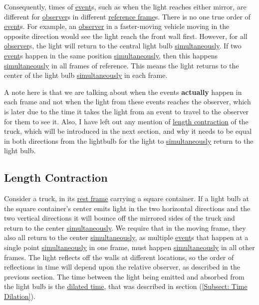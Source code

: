 Consequently, times of \hyperlink{def-event}{event}s, such as when the light reaches either mirror, are different for \hyperlink{def-observer}{observer}s in different \hyperlink{def-Reference-frame}{reference frame}s.
There is no one true order of \hyperlink{def-event}{event}s.
For example, an \hyperlink{def-observer}{observer} in a faster-moving vehicle moving in the opposite direction would see the light reach the front wall first.
However, for all \hyperlink{def-observer}{observer}s, the light will return to the central light bulb \hyperlink{def-simultaneity}{simultaneously}.
If two \hyperlink{def-event}{event}s happen in the same position \hyperlink{def-simultaneity}{simultaneously}, then this happens \hyperlink{def-simultaneity}{simultaneously} in all frames of reference.
This means the light returns to the center of the light bulb \hyperlink{def-simultaneity}{simultaneously} in each frame.

A note here is that we are talking about when the events \textbf{actually} happen in each frame and not when the light from these events reaches the observer, which is later due to the time it takes the light from an event to travel to the observer for them to see it.
Also, I have left out any mention of \hyperlink{def-length-contraction}{length contraction} of the truck, which will be introduced in the next section, and why it needs to be equal in both directions from the lightbulb for the light to \hyperlink{def-simultaneity}{simultaneously} return to the light bulb.


\subsection{Length Contraction} \label{subsect: Length Contraction}

Consider a truck, in its \hyperlink{def-proper-frame}{rest frame} carrying a square container.
If a light bulb at the square container's center emits light in the two horizontal directions and the two vertical directions it will bounce off the mirrored sides of the truck and return to the center \hyperlink{def-simultaneity}{simultaneously}.
We require that in the moving frame, they also all return to the center \hyperlink{def-simultaneity}{simultaneously}, as multiple \hyperlink{def-event}{event}s that happen at a single point \hyperlink{def-simultaneity}{simultaneously} in one frame, must happen \hyperlink{def-simultaneity}{simultaneously} in all other frames.
The light reflects off the walls at different locations, so the order of reflections in time will depend upon the relative observer, as described in the previous section.
The time between the light being emitted and absorbed from the light bulb is the \hyperlink{def-time-dilation}{dilated time}, that was described in section (\ref{Subsect: Time Dilation}).

